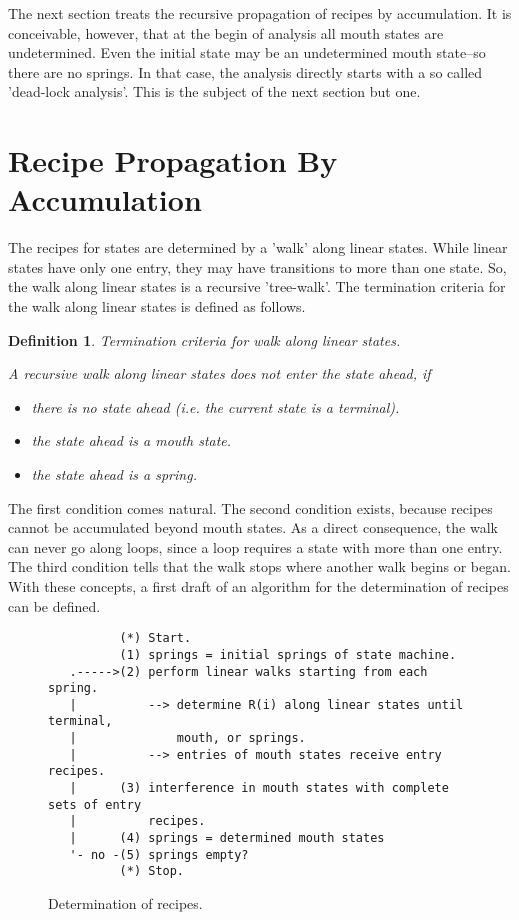 \documentclass[12pt,a4paper]{scrartcl}
\newtheorem{definition}{Definition}
\begin{document}
The next section treats the recursive propagation of recipes by accumulation.
It is conceivable, however, that at the begin of analysis all mouth states are
undetermined. Even the initial state may be an undetermined mouth state--so
there are no springs. In that case, the analysis directly starts with a so
called 'dead-lock analysis'. This is the subject of the next section but one.

%
\section{Recipe Propagation By Accumulation}

The recipes for states are determined by a 'walk' along linear states. While
linear states have only one entry, they may have transitions to more than one
state. So, the walk along linear states is a recursive 'tree-walk'. The
termination criteria for the walk along linear states is defined as follows.

\begin{definition}
Termination criteria for walk along linear states.

A recursive walk along linear states does not enter the
state ahead, if 

\begin{itemize}
    \item there is no state ahead (i.e. the current state is a terminal).
    \item the state ahead is a mouth state.
    \item the state ahead is a spring.
\end{itemize}
\end{definition}

The first condition comes natural. The second condition exists, because recipes
cannot be accumulated beyond mouth states. As a direct consequence, the walk
can never go along loops, since a loop requires a state with more than one
entry. The third condition tells that the walk stops where another walk begins
or began.  With these concepts, a first draft of an algorithm for the
determination of recipes can be defined.

\begin{figure}[htbp] \leavevmode
\begin{verbatim}
          (*) Start.
          (1) springs = initial springs of state machine.
   .----->(2) perform linear walks starting from each spring.
   |          --> determine R(i) along linear states until terminal,
   |              mouth, or springs.
   |          --> entries of mouth states receive entry recipes.
   |      (3) interference in mouth states with complete sets of entry
   |          recipes.
   |      (4) springs = determined mouth states
   '- no -(5) springs empty?
          (*) Stop.
\end{verbatim}

\caption{Determination of recipes.}
\end{figure}
\end{document}
